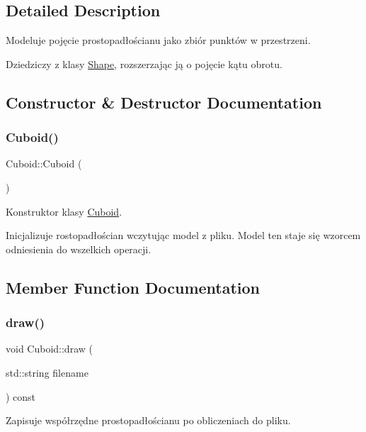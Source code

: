 \subsection{Detailed Description}
Modeluje pojęcie prostopadłościanu jako zbiór punktów w przestrzeni. 

Dziedziczy z klasy \hyperlink{class_shape}{Shape}, rozszerzając ją o pojęcie kątu obrotu. 

\subsection{Constructor \& Destructor Documentation}
\mbox{\label{class_cuboid_a1abf60e93d024b7a01ee5b1a48f1f08a}} 
\subsubsection{\texorpdfstring{Cuboid()}{Cuboid()}}
{\footnotesize\ttfamily Cuboid\+::\+Cuboid (\begin{DoxyParamCaption}{ }\end{DoxyParamCaption})}



Konstruktor klasy \hyperlink{class_cuboid}{Cuboid}. 

Inicjalizuje rostopadłościan wczytując model z pliku. Model ten staje się wzorcem odniesienia do wszelkich operacji. 

\subsection{Member Function Documentation}
\mbox{\label{class_cuboid_a0668739d601192eee110f4e50a1ddd13}} 
\subsubsection{\texorpdfstring{draw()}{draw()}}
{\footnotesize\ttfamily void Cuboid\+::draw (\begin{DoxyParamCaption}\item[{std\+::string}]{filename }\end{DoxyParamCaption}) const}



Zapisuje współrzędne prostopadłościanu po obliczeniach do pliku. 

